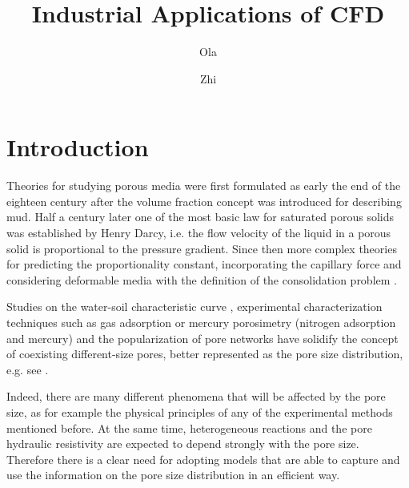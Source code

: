 \documentclass{CFD2011}
\title{Industrial Applications of CFD}
\author{Ola}{Nordmann} %
\author{Zhi}{L. Xie}
\newcommand{\Fede}[1]{\textcolor{green}{#1} \\}
\begin{document}
\maketitle  %
\headers   %

\newpage

\section{Introduction}

Theories for studying porous media were first formulated as early the end of the eighteen century after the volume fraction concept was introduced for describing mud. Half a century later one of the most basic law for saturated porous solids was established by Henry Darcy, i.e. the flow velocity of the liquid in a porous solid is proportional to the pressure gradient. Since then more complex theories for predicting the proportionality constant, incorporating the capillary force and considering deformable media with the definition of the consolidation problem \citep{Boer1992}. 

Studies on the water-soil characteristic curve \citep{durner1994}, experimental characterization techniques such as gas adsorption or mercury porosimetry \citep{Navas,Jaroniec1997,Abell1999}(nitrogen adsorption and mercury) and the popularization of pore networks \citep{zhang1994, held2001, blunt2002, piri2005, ahrenholz2008, sholokhova2009} have solidify the concept of coexisting different-size pores, better represented as the pore size distribution, e.g. see \cite{dullien1991}.

Indeed, there are many different phenomena that will be affected by the pore size, as for example the physical principles of any of the experimental methods mentioned before. At the same time, heterogeneous reactions and the pore hydraulic resistivity are expected to depend strongly with the pore size. Therefore there is a clear need for adopting models that are able to capture and use the information on the pore size distribution in an efficient way.
\end{document}
